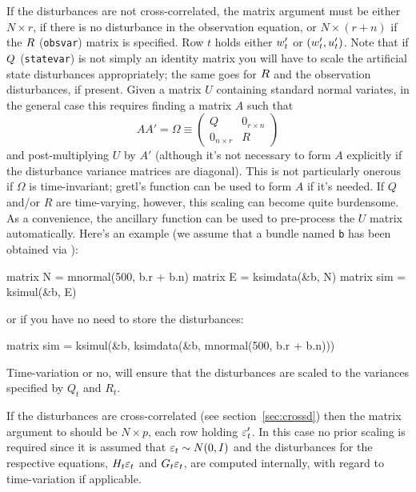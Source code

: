 If the disturbances are not cross-correlated, the matrix argument must
be either $N \times r$, if there is no disturbance in the observation
equation, or $N \times (r+n)$ if the $R$ (\texttt{obsvar})
matrix is specified. Row $t$ holds either $w_t'$ or
$(w_t', u_t')$. Note that if $Q$
(\texttt{statevar}) is not simply an identity matrix you will have to
scale the artificial state disturbances appropriately; the same goes
for $R$ and the observation disturbances, if present. Given a
matrix $U$ containing standard normal variates, in the general case
this requires finding a matrix $A$ such that
\[
AA' = \Omega \equiv \left(
\begin{array}{ll}
Q & 0_{r \times n} \\
0_{n\times r} & R
\end{array}
\right)
\]
and post-multiplying $U$ by $A'$ (although it's not necessary to form
$A$ explicitly if the disturbance variance matrices are
diagonal). This is not particularly onerous if $\Omega$ is
time-invariant; gretl's  function can be used to form $A$
if it's needed. If $Q$ and/or $R$ are time-varying, however, this
scaling can become quite burdensome. As a convenience, the ancillary
function  can be used to pre-process the $U$ matrix
automatically. Here's an example (we assume that a bundle named
\texttt{b} has been obtained via ):
%
\begin{code}
matrix N = mnormal(500, b.r + b.n)
matrix E = ksimdata(&b, N)
matrix sim = ksimul(&b, E)
\end{code}
%
or if you have no need to store the disturbances:
%
\begin{code}
matrix sim = ksimul(&b, ksimdata(&b, mnormal(500, b.r + b.n)))
\end{code}
%
Time-variation or no,  will ensure that the
disturbances are scaled to the variances specified by $Q_t$ and $R_t$.

If the disturbances are cross-correlated (see
section~\ref{sec:crossd}) then the matrix argument to 
should be $N \times p$, each row holding $\varepsilon_t'$. In this case
no prior scaling is required since it is assumed that
$\varepsilon_t \sim N(0, I)$ and the disturbances for the respective
equations, $H_t \varepsilon_t$ and $G_t \varepsilon_t$,
are computed internally, with regard to time-variation if applicable.


